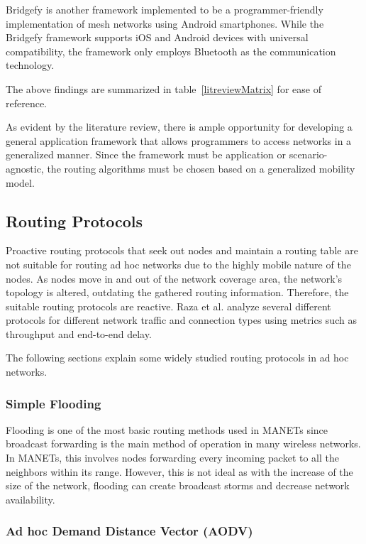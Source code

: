 Bridgefy\cite{bridgefy} is another framework implemented to be a
programmer-friendly implementation of mesh networks using Android smartphones.
While the Bridgefy framework supports iOS and Android devices with universal
compatibility, the framework only employs Bluetooth as the communication
technology.

The above findings are summarized in table~\ref{litreviewMatrix} for ease of reference.

As evident by the literature review, there is ample opportunity for developing
a general application framework that allows programmers to access networks in a
generalized manner. Since the framework must be application or
scenario-agnostic, the routing algorithms must be chosen based on a generalized
mobility model.



\subsection{Routing Protocols}

Proactive routing protocols that seek out nodes and maintain a routing table
are not suitable for routing ad hoc networks due to the highly mobile nature of
the nodes. As nodes move in and out of the network coverage area, the network's
topology is altered, outdating the gathered routing information. Therefore, the
suitable routing protocols are reactive\cite{reina2011}. Raza et
al.\cite{raza2016} analyze several different protocols for different network
traffic and connection types using metrics such as throughput and end-to-end
delay.

The following sections explain some widely studied routing protocols in ad hoc
networks.

\subsubsection{Simple Flooding}

Flooding is one of the most basic routing methods used in MANETs since
broadcast forwarding is the main method of operation in many wireless
networks\cite{chlamtac2003}. In MANETs, this involves nodes forwarding every
incoming packet to all the neighbors within its range. However, this is not
ideal as with the increase of the size of the network, flooding can create
broadcast storms and decrease network availability\cite{chlamtac2003}.

\subsubsection{Ad hoc Demand Distance Vector (AODV) }

